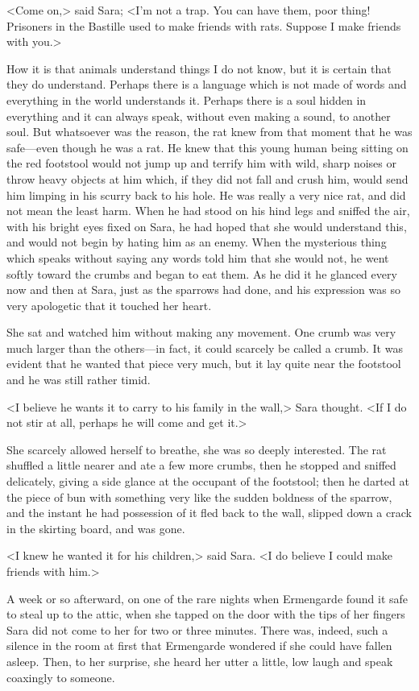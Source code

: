 <Come on,> said Sara; <I'm not a trap. You can have them, poor thing! Prisoners in the Bastille used to make friends with rats. Suppose I make friends with you.>

How it is that animals understand things I do not know, but it is certain that they do understand. Perhaps there is a language which is not made of words and everything in the world understands it. Perhaps there is a soul hidden in everything and it can always speak, without even making a sound, to another soul. But whatsoever was the reason, the rat knew from that moment that he was safe—even though he was a rat. He knew that this young human being sitting on the red footstool would not jump up and terrify him with wild, sharp noises or throw heavy objects at him which, if they did not fall and crush him, would send him limping in his scurry back to his hole. He was really a very nice rat, and did not mean the least harm. When he had stood on his hind legs and sniffed the air, with his bright eyes fixed on Sara, he had hoped that she would understand this, and would not begin by hating him as an enemy. When the mysterious thing which speaks without saying any words told him that she would not, he went softly toward the crumbs and began to eat them. As he did it he glanced every now and then at Sara, just as the sparrows had done, and his expression was so very apologetic that it touched her heart.

She sat and watched him without making any movement. One crumb was very much larger than the others—in fact, it could scarcely be called a crumb. It was evident that he wanted that piece very much, but it lay quite near the footstool and he was still rather timid.

<I believe he wants it to carry to his family in the wall,> Sara thought. <If I do not stir at all, perhaps he will come and get it.>

She scarcely allowed herself to breathe, she was so deeply interested. The rat shuffled a little nearer and ate a few more crumbs, then he stopped and sniffed delicately, giving a side glance at the occupant of the footstool; then he darted at the piece of bun with something very like the sudden boldness of the sparrow, and the instant he had possession of it fled back to the wall, slipped down a crack in the skirting board, and was gone.

<I knew he wanted it for his children,> said Sara. <I do believe I could make friends with him.>

A week or so afterward, on one of the rare nights when Ermengarde found it safe to steal up to the attic, when she tapped on the door with the tips of her fingers Sara did not come to her for two or three minutes. There was, indeed, such a silence in the room at first that Ermengarde wondered if she could have fallen asleep. Then, to her surprise, she heard her utter a little, low laugh and speak coaxingly to someone.

